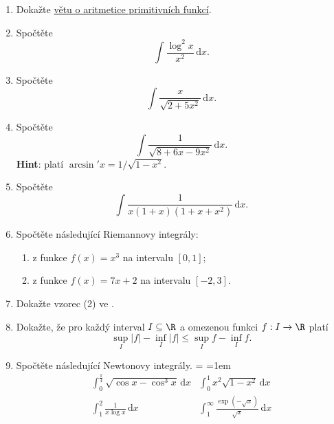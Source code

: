 \section*{}
\begin{enumerate}
 \item Dokažte \hyperref[thm:aritmetika-primitivnich-funkci]{větu o aritmetice
  primitivních funkcí}.
 \item Spočtěte
  \[
   \int \frac{\log^2 x}{x^2} \, \mathrm{d}x.
  \]
 \item Spočtěte
  \[
   \int \frac{x}{\sqrt{2 + 5x^2}} \, \mathrm{d}x.
  \]
 \item Spočtěte
  \[
   \int \frac{1}{\sqrt{8 + 6x - 9x^2}} \, \mathrm{d}x.
  \]
  \textbf{Hint}: platí $\arcsin'x = 1 / \sqrt{1 - x^2}$.
 \item 
  Spočtěte
  \[
   \int \frac{1}{x(1+x)(1 + x + x^2)} \, \mathrm{d}x. 
  \]
 \item Spočtěte následující Riemannovy integrály:
  \begin{enumerate}
   \item z funkce $f(x) = x^3$ na intervalu $[0,1]$;
   \item z funkce $f(x) = 7x + 2$ na intervalu $[-2,3]$.
  \end{enumerate}
 \item Dokažte vzorec (2) ve .
 \item Dokažte, že pro každý interval $I \subseteq \R$ a omezenou funkci $f:I
  \to \R$ platí
  \[
   \sup_I |f| - \inf_I |f| \leq \sup_I f - \inf_I f.
  \]
 \item Spočtěte následující Newtonovy integrály.
  {\everymath={\displaystyle}
   \arraycolsep=1em
   \[
    \begin{array}{ll}
     \int_{0}^{\frac{\pi}{4}} \sqrt{\cos x - \cos^3 x} \, \mathrm{d}x &
     \int_{0}^{1} x^2 \sqrt{1 - x^2} \, \mathrm{d}x\\[2em]
     \int_{1}^{2} \frac{1}{x\log x} \, \mathrm{d}x & \int_{1}^{\infty}
     \frac{\exp(-\sqrt{x})}{\sqrt{x}} \, \mathrm{d}x
    \end{array}
   \]
  }
\end{enumerate}
